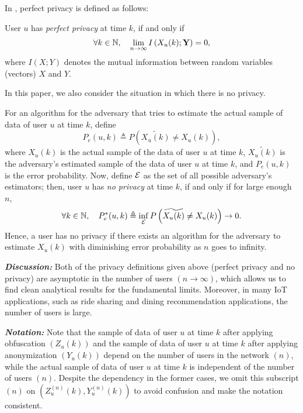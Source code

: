 In \cite{tifs2016}, perfect privacy is defined as follows:
\begin{define}
User $u$ has \emph{perfect privacy} at time $k$, if and only if
\begin{align}%
\no  \forall k\in \mathbb{N}, \ \ \ \lim\limits_{n\rightarrow \infty} I \left(X_u(k);{\textbf{Y}}\right) =0,
\end{align}
where $I(X;Y)$ denotes the mutual information between random variables (vectors) $X$ and $Y$.
\end{define}

\noindent In this paper, we also consider the situation in which there is no privacy. 

\begin{define}
For an algorithm for the adversary that tries to estimate the actual sample of data of user $u$ at time $k$, define
\[P_e(u,k)\triangleq P\left(\widetilde{X_u(k)} \neq X_u(k)\right),\]
where $X_u(k)$ is the actual sample of the data of user $u$ at time $k$, $\widetilde{X_u(k)}$ is the adversary's estimated sample of the data of user $u$ at time $k$, and $P_e(u,k)$ is the error probability. Now, define ${\cal E}$ as the set of all possible adversary's estimators; then, user $u$ has \emph{no privacy} at time $k$, if and only if for large enough $n$,
\[
\forall k\in \mathbb{N}, \ \ \ P^{*}_e(u,k)\triangleq \inf_{\cal E} {P\left(\widetilde{X_u(k)} \neq X_u(k)\right)} \rightarrow 0.
\]
Hence, a user has no privacy if there exists an algorithm for the adversary to estimate $X_u(k)$ with diminishing error probability as $n$ goes to infinity.
\end{define}

\textbf{\textit{Discussion:}} Both of the privacy definitions given above (perfect privacy and no privacy) are asymptotic in the number of users $(n \to \infty)$, which allows us to find clean analytical results for the fundamental limits. Moreover, in many IoT applications, such as ride sharing and dining recommendation applications, the number of users is large. %

\textbf{\textit{Notation:}} Note that the sample of data of user $u$ at time $k$ after applying obfuscation $\left(Z_u(k)\right)$ and the sample of data of user $u$ at time $k$ after applying anonymization $\left(Y_u(k)\right)$ depend on the number of users in the network $(n)$, while the actual sample of data of user $u$ at time $k$ is independent of the number of users $(n)$.  Despite the dependency in the former cases, we omit this subscript $(n)$ on $\left(Z_u^{(n)}(k), Y_u^{(n)}(k) \right)$ to avoid confusion and make the notation consistent.

